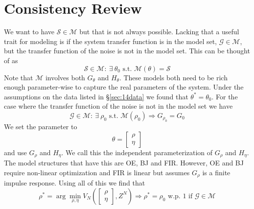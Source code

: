 \section{Consistency Review}
We want to have $\mathcal{S}\in\mathcal{M}$ but that is not always possible. Lacking that a useful trait for modeling is if the system transfer function is in the model set, $\mathcal{G}\in\mathcal{M}$, but the transfer function of the noise is not in the model set. This can be thought of as
$$\mathcal{S}\in\mathcal{M}:~\exists~\theta_0 \text{ s.t. } \mathcal{M}(\theta)=\mathcal{S}$$
Note that $\mathcal{M}$ involves both $G_\theta$ and $H_\theta$. These models both need to be rich enough parameter-wise to capture the real parameters of the system. Under the assumptions on the data listed in \S\ref{sec:14data} we found that $\theta^\ast=\theta_0$. For the case where the transfer function of the noise is not in the model set we have
$$\mathcal{G}\in\mathcal{M}:~\exists~\rho_0 \text{ s.t. } \mathcal{M}(\rho_0) \Rightarrow G_{\rho_0}=G_0$$
We set the parameter to
$$\theta = \left[\begin{array}{c} \rho \\ \eta \end{array}\right]$$
and use $G_\rho$ and $H_\eta$. We call this the independent parameterization of $G_\rho$ and $H_\eta$. The model structures that have this are OE, BJ and FIR. However, OE and BJ require non-linear optimization and FIR is linear but assumes $G_\rho$ is a finite impulse response. Using all of this we find that
$$\rho^\ast = \arg\min_{\rho,\eta} V_N\left(\left[\begin{array}{c} \rho \\ \eta \end{array}\right],Z^N\right) \Rightarrow \rho^\ast = \rho_0 \text{ w.p. } 1 \text{ if } \mathcal{G}\in\mathcal{M}$$

